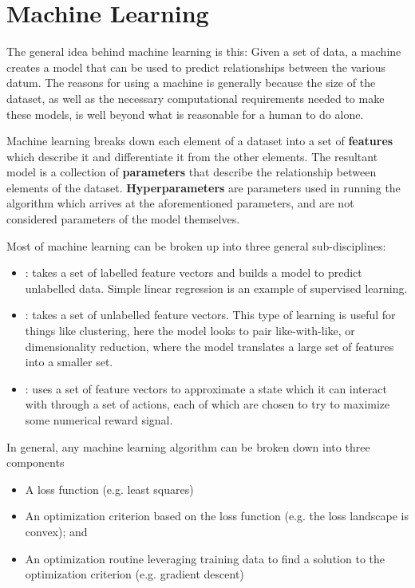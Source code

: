 
\chapter{Machine Learning}

The general idea behind machine learning is this: Given a set of data, a machine creates a model that can be used to predict relationships between the various datum. The reasons for using a machine is generally because the size of the dataset, as well as the necessary computational requirements needed to make these models, is well beyond what is reasonable for a human to do alone.

Machine learning breaks down each element of a dataset into a set of \textbf{features} which describe it and differentiate it from the other elements. The resultant model is a collection of \textbf{parameters} that describe the relationship between elements of the dataset. \textbf{Hyperparameters} are parameters used in running the algorithm which arrives at the aforementioned parameters, and are not considered parameters of the model themselves.

Most of machine learning can be broken up into three general sub-disciplines:
\begin{itemize}
	\item {}: takes a set of labelled feature vectors and builds a model to predict unlabelled data. Simple linear regression is an example of supervised learning.
	\item {}: takes a set of unlabelled feature vectors. This type of learning is useful for things like clustering, here the model looks to pair like-with-like, or dimensionality reduction, where the model translates a large set of features into a smaller set.
	\item {}: uses a set of feature vectors to approximate a state which it can interact with through a set of actions, each of which are chosen to try to maximize some numerical reward signal. 
\end{itemize}



In general, any machine learning algorithm can be broken down into three components \cite{burkov}
\begin{itemize}
    \item A loss function (e.g. least squares)
    \item An optimization criterion based on the loss function (e.g. the loss landscape is convex); and
    \item An optimization routine leveraging training data to find a solution to the optimization criterion (e.g. gradient descent)
\end{itemize}

